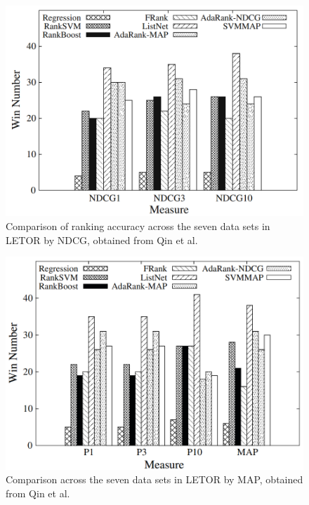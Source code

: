 \begin{figure}[!h]
\includegraphics[scale=0.30]{gfx/ndcg_winning_number}
\caption{Comparison of ranking accuracy across the seven data sets in LETOR by \acs{NDCG}, obtained from Qin et al. \cite{Qin2010}}
\label{fig:ndcg_winning_number}
\end{figure}

\begin{figure}[!h]
\includegraphics[scale=0.30]{gfx/map_winning_number}
\caption{Comparison across the seven data sets in LETOR by \acs{MAP}, obtained from Qin et al. \cite{Qin2010}}
\label{fig:map_winning_number}
\end{figure}

